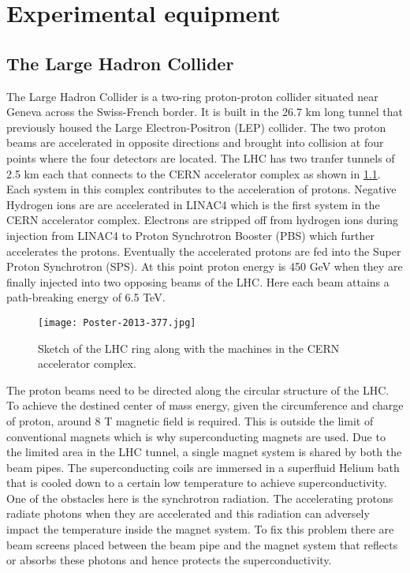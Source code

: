 
\chapter{Experimental equipment}
\label{sec:LHCATLAS}

\section{The Large Hadron Collider}
The Large Hadron Collider is a two-ring proton-proton collider situated near Geneva across the Swiss-French border. It is built in the 26.7 km long tunnel 
that previously housed the Large Electron-Positron (LEP) collider. The two proton beams are accelerated in opposite directions and brought into collision at 
four points where the four detectors are located. The LHC has two tranfer tunnels of 2.5 km each that connects to the CERN accelerator complex as shown in 
\cref{fig:acc_complex}. Each system in this complex contributes to the acceleration of protons. Negative Hydrogen ions are are accelerated in LINAC4 which 
is the first system in the CERN accelerator complex. Electrons are stripped off from hydrogen ions during injection from LINAC4 to Proton Synchrotron Booster (PBS) 
which further accelerates the protons. Eventually the accelerated protons are fed into the Super Proton Synchrotron (SPS). At this point proton energy is 450 GeV 
when they are finally injected into two opposing beams of the LHC. Here each beam attains a path-breaking energy of 6.5 TeV. 

\begin{figure}[htbp]
    \centering
    \texttt{[image: Poster-2013-377.jpg]}
    \caption[Sketch of the CERN accelerator complex]{Sketch of the LHC ring along with the machines in the CERN accelerator complex\cite{Haffner:1621894}.}%
    \label{fig:acc_complex}
\end{figure}


The proton beams need to be directed along the circular structure of the LHC. To achieve the destined center of mass energy, given the circumference and charge
of proton, around 8 T magnetic field is required. This is outside the limit of conventional magnets which is why superconducting magnets are used. Due to the limited
area in the LHC tunnel, a single magnet system is shared by both the beam pipes. The superconducting coils are immersed in a superfluid Helium bath
that is cooled down to a certain low temperature to achieve superconductivity. One of the obstacles here is the synchrotron radiation. The accelerating protons 
radiate photons when they are accelerated and this radiation can adversely impact the temperature inside the magnet system. To fix this problem there are beam 
screens placed between the beam pipe and the magnet system that reflects or absorbs these photons and hence protects the superconductivity. 

